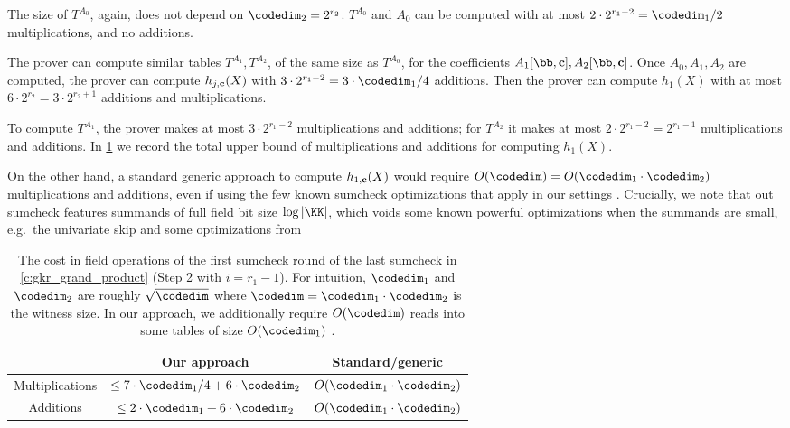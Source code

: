 The size of $T^{A_0}$, again, does not depend on $\codedim_2=2^{r_2}$. $T^{A_0}$ and $A_0$ can  be computed with at most $2\cdot 2^{r_1-2} =\codedim_1/2$ multiplications, and no additions.%

The prover can compute similar tables $T^{A_1}, T^{A_2}$, of the same size as $T^{A_0}$, for the coefficients $A_1[\bb,\cc], A_2[\bb,\cc]$. %
 Once $A_0,A_1,A_2$ are computed, the prover can compute $h_{j, \mathbf{c}}(X)$ with $3\cdot 2^{r_1-2}=3\cdot \codedim_1/4$ additions. Then the prover can compute $h_1(X)$ with at most $6\cdot 2^{r_2} = 3\cdot 2^{r_2+1}$ additions and multiplications. 
 
To compute  $T^{A_1}$, the prover makes at most $3\cdot 2^{r_1-2}$ multiplications and additions; for $T^{A_2}$ it makes at most $2\cdot 2^{r_1-2} = 2^{r_1-1}$ multiplications and additions.  In \cref{t:gkr_step1_costs} we record the total upper bound of multiplications and additions for computing $h_1(X)$. 


 On the other hand, a standard generic approach to compute $h_{1,\mathbf{c}}(X)$ would require $O(\codedim)=O(\codedim_1\cdot \codedim_2)$ multiplications and additions, even if using the few known sumcheck optimizations that apply in our settings . Crucially, we note that out sumcheck features summands of full field bit size $\log|\KK|$, which voids some known powerful optimizations when the summands are small, e.g.\ the univariate skip \cite{?} and some optimizations from \cite{?} 


\begin{table}[H]
    \centering
    \begin{tabular}{c|c|c}
         & Our approach & Standard/generic \\
         \hline
        Multiplications & $\leq   7\cdot \codedim_1/4 +  6\cdot \codedim_2 $ &$O(\codedim_1\cdot \codedim_2)$\\
        \hline
        Additions & $\leq 2\cdot\codedim_1 +  6\cdot \codedim_2$ & $O(\codedim_1\cdot \codedim_2)$
    \end{tabular}
    \caption{The cost in field operations of the first sumcheck round of the last sumcheck in \cref{c:gkr_grand_product} (Step 2 with $i=r_1-1$). For intuition, $\codedim_1$ and $\codedim_2$ are roughly $\sqrt{\codedim}$ where $\codedim=\codedim_1\cdot \codedim_2$ is the witness size. In our approach, we additionally require $O(\codedim)$ reads into some tables of size $O(\codedim_1)$ .}
    \label{t:gkr_step1_costs}
\end{table}


